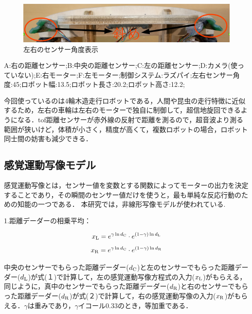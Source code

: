 \documentclass[twocolumn]{jarticle} %
\begin{document}
\begin{figure}[h]
        \centering
        \includegraphics[width=1.0\linewidth]{robot4.jpg}
        \caption{左右のセンサー角度表示}
\end{figure}


A:右の距離センサー;B:中央の距離センサー;C:左の距離センサー;D:カメラ(使っていない);E:右モーター;F:左モーター;制御システム:ラズパイ;左右センサー角度:45\degree;ロボット幅:13.5;ロボット長さ:20.2;ロボット高さ:12.2;



今回使っているのは4輪木造走行ロボットである，人間や昆虫の走行特徴に近似するため，左右の車輪は左右のモーターで独自に制御して，超信地旋回できるようになる．tof距離センサーが赤外線の反射で距離を測るので，超音波より測る範囲が狭いけど，体積が小さく，精度が高くて，複数ロボットの場合，ロボット同士間の妨害も減少できる．

\subsection{感覚運動写像モデル}

感覚運動写像とは，センサー値を変数とする関数によってモーターの出力を決定することであり，その瞬間のセンサー値だけを使うと，最も単純な反応行動のための知能の一つである．
本研究では，非線形写像モデルが使われている.

1.距離デーダーの相乗平均：

\begin{equation}
  x_{\rm L} = e^{\gamma \ln d_{\rm C}} \cdot e^{(1-\gamma)\ln d_{\rm L}} 
\end{equation}
\begin{equation}
  x_{\rm R} = e^{\gamma \ln d_{\rm C}} \cdot e^{(1-\gamma)\ln d_{\rm R}} 
\end{equation}

中央のセンサーでもらった距離デーダー($d_{\rm C}$)と左のセンサーでもらった距離デーダー($d_{\rm L}$)が式(１)で計算して，左の感覚運動写像方程式の入力($x_{\rm L}$)がもらえる，同じように，真中のセンサーでもらった距離デーダー($d_{\rm R}$)と右のセンサーでもらった距離デーダー($d_{\rm R}$)が式(２)で計算して，右の感覚運動写像の入力($x_{\rm R}$)がもらえる．$\gamma$は重みであり，$\gamma$イコール0.33のとき，等加重である．
\end{document}
